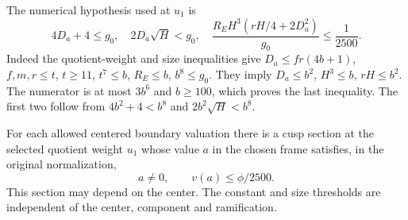 The numerical hypothesis used at \(u_1\) is
\[
 4D_a+4\le g_0,\quad 2D_a\sqrt H<g_0,\quad
 \frac{R_E H^3(rH/4+2D_a^2)}{g_0}\le\frac1{2500}.
\]
Indeed the quotient-weight and size inequalities give
\(D_a\le fr(4b+1)\), \(f,m,r\le t\), \(t\ge11\),
\(t^7\le b\), \(R_E\le b\), \(b^8\le g_0\).
They imply \(D_a\le b^2\), \(H^3\le b\),
\(rH\le b^2\). The numerator is at most \(3b^6\)
and \(b\ge100\), which proves the last inequality.
The first two follow from \(4b^2+4<b^8\) and
\(2b^2\sqrt H<b^8\).
\label{cor:deep-boundary-orders-5}

\begin{lemma}
\label{lem:deep-boundary-detecting-section}
For each allowed centered boundary valuation there is a cusp
section at the selected quotient weight \(u_1\) whose value \(a\) in the chosen frame satisfies, in the original normalization,
\[
 a\ne0,\qquad v(a)\le\phi/2500.
\]
 This section may depend on the center. The
constant and size thresholds are independent of the center,
component and ramification.
\end{lemma}

